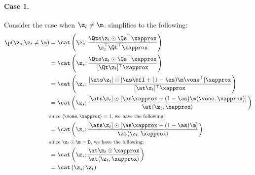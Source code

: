 \documentclass{article} %
\begin{document}
{\begin{appendices}
\paragraph{Case 1.} Consider the case when $\z_t \neq \m$.  simplifies to the following:
\begin{align}\label{eqn:p_st_discrete_old_case_1}
    \p(\z_s | \z_t \neq \m)
    & = \cat \left(\z_s; \frac{\Qts \z_t \odot \Qs^\top \xapprox}{
            \z_t^\top \Qt^\top \xapprox} \right)  \nonumber \\
    & = \cat \left(\z_s; \frac{\Qts \z_t \odot \Qs^\top \xapprox}{
            [\Qt \z_t] ^ \top \xapprox} \right) \nonumber \\
    & = \cat \left(\z_s; 
        \frac{[\ats \z_t] \odot [\as \bfI+ (1 - \as) \m \vone^\top] \xapprox}{
            [\at \z_t] ^ \top \xapprox} \right) \nonumber \\
    & = \cat \left(\z_s; 
        \frac{[\ats \z_t] \odot [\as \xapprox + (1 - \as) \m  \langle \vone, \xapprox \rangle] }{
            \at \langle \z_t, \xapprox \rangle } \right)  \nonumber \\
    & \text{\footnotesize since $\langle \vone, \xapprox \rangle = 1$, we have the following:} \nonumber \\
    & = \cat \left(\z_s; 
        \frac{[\ats \z_t] \odot [\as \xapprox + (1 - \as) \m ] }{
            \at \langle \z_t, \xapprox \rangle  } \right) \nonumber \\
    & \text{\footnotesize since $\z_t \odot \m = \mathbf{0}$, we have the following:} \nonumber \\
    & = \cat \left(\z_s; 
        \frac{\at \z_t \odot \xapprox}{
            \at \langle \z_t, \xapprox \rangle } \right) \nonumber \\
    & = \cat \left(\z_s; \z_t \right) 
\end{align}


\end{appendices}}
\end{document}
